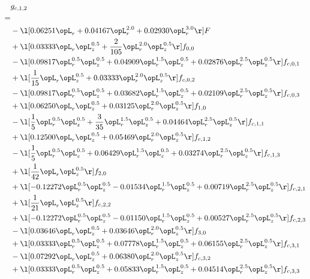 \begin{alignat}{2} 
\label{eq:g_12_0} 
& g_{c,1,2} \nonumber \\ 
 = \\ 
& - \l[  0.06251 \opL_r +  0.04167 \opL_r^{2.0} +  0.02930 \opL_r^{3.0}  \r] F \nonumber \\ 
& + \l[  0.03333 \opL_r \opL_z^{0.5} + \frac{2}{105} \opL_r^{2.0} \opL_z^{0.5}  \r] f_{0,0} \nonumber \\ 
& - \l[  0.09817 \opL_r^{0.5} \opL_z^{0.5} +  0.04909 \opL_r^{1.5} \opL_z^{0.5} +  0.02876 \opL_r^{2.5} \opL_z^{0.5}  \r] f_{c,0,1} \nonumber \\ 
& + \l[ \frac{1}{15} \opL_r \opL_z^{0.5} +  0.03333 \opL_r^{2.0} \opL_z^{0.5}  \r] f_{c,0,2} \nonumber \\ 
& - \l[  0.09817 \opL_r^{0.5} \opL_z^{0.5} +  0.03682 \opL_r^{1.5} \opL_z^{0.5} +  0.02109 \opL_r^{2.5} \opL_z^{0.5}  \r] f_{c,0,3} \nonumber \\ 
& + \l[  0.06250 \opL_r \opL_z^{0.5} +  0.03125 \opL_r^{2.0} \opL_z^{0.5}  \r] f_{1,0} \nonumber \\ 
& - \l[ \frac{1}{5} \opL_r^{0.5} \opL_z^{0.5} + \frac{3}{35} \opL_r^{1.5} \opL_z^{0.5} +  0.04464 \opL_r^{2.5} \opL_z^{0.5}  \r] f_{c,1,1} \nonumber \\ 
& + \l[  0.12500 \opL_r \opL_z^{0.5} +  0.05469 \opL_r^{2.0} \opL_z^{0.5}  \r] f_{c,1,2} \nonumber \\ 
& - \l[ \frac{1}{5} \opL_r^{0.5} \opL_z^{0.5} +  0.06429 \opL_r^{1.5} \opL_z^{0.5} +  0.03274 \opL_r^{2.5} \opL_z^{0.5}  \r] f_{c,1,3} \nonumber \\ 
& + \l[ \frac{1}{42} \opL_r \opL_z^{0.5}  \r] f_{2,0} \nonumber \\ 
& + \l[  -0.12272 \opL_r^{0.5} \opL_z^{0.5}   -0.01534 \opL_r^{1.5} \opL_z^{0.5} +  0.00719 \opL_r^{2.5} \opL_z^{0.5}  \r] f_{c,2,1} \nonumber \\ 
& + \l[ \frac{1}{21} \opL_r \opL_z^{0.5}  \r] f_{c,2,2} \nonumber \\ 
& + \l[  -0.12272 \opL_r^{0.5} \opL_z^{0.5}   -0.01150 \opL_r^{1.5} \opL_z^{0.5} +  0.00527 \opL_r^{2.5} \opL_z^{0.5}  \r] f_{c,2,3} \nonumber \\ 
& - \l[  0.03646 \opL_r \opL_z^{0.5} +  0.03646 \opL_r^{2.0} \opL_z^{0.5}  \r] f_{3,0} \nonumber \\ 
& + \l[  0.03333 \opL_r^{0.5} \opL_z^{0.5} +  0.07778 \opL_r^{1.5} \opL_z^{0.5} +  0.06155 \opL_r^{2.5} \opL_z^{0.5}  \r] f_{c,3,1} \nonumber \\ 
& - \l[  0.07292 \opL_r \opL_z^{0.5} +  0.06380 \opL_r^{2.0} \opL_z^{0.5}  \r] f_{c,3,2} \nonumber \\ 
& + \l[  0.03333 \opL_r^{0.5} \opL_z^{0.5} +  0.05833 \opL_r^{1.5} \opL_z^{0.5} +  0.04514 \opL_r^{2.5} \opL_z^{0.5}  \r] f_{c,3,3} \nonumber \\ 
\end{alignat} 


